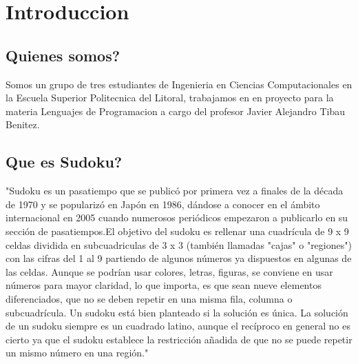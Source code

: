 \documentclass[11pt,fleqn]{book} %
\begin{document}

\pagestyle{empty} %

\tableofcontents %

\cleardoublepage %

\pagestyle{fancy} %



\chapter{Introduccion}

\section{Quienes somos?}

Somos un grupo de tres estudiantes de Ingenieria en Ciencias Computacionales en la Escuela Superior Politecnica del Litoral, trabajamos en en proyecto para la materia Lenguajes de Programacion a cargo del profesor Javier Alejandro Tibau Benitez.



\section{Que es Sudoku?}

"Sudoku es un pasatiempo que se publicó por primera vez a finales de la década de 1970 y se popularizó en Japón en 1986, dándose a conocer en el ámbito internacional en 2005 cuando numerosos periódicos empezaron a publicarlo en su sección de pasatiempos.El objetivo del sudoku es rellenar una cuadrícula de 9 x 9 celdas dividida en subcuadriculas de 3 x 3 (también llamadas "cajas" o "regiones") con las cifras del 1 al 9 partiendo de algunos números ya dispuestos en algunas de las celdas.  Aunque se podrían usar colores, letras, figuras, se conviene en usar números para mayor claridad, lo que importa, es que sean nueve elementos diferenciados, que no se deben repetir en una misma fila, columna o subcuadrícula. Un sudoku está bien planteado si la solución es única. La solución de un sudoku siempre es un cuadrado latino, aunque el recíproco en general no es cierto ya que el sudoku establece la restricción añadida de que no se puede repetir un mismo número en una región." \cite{http://es.wikipedia.org/wiki/Sudoku}
\end{document}
